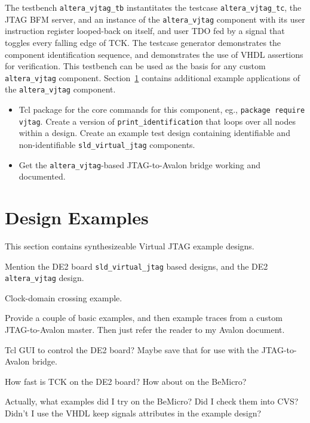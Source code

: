 \documentclass[10pt,twoside]{article}
\begin{document}
The testbench \verb+altera_vjtag_tb+ instantitates the testcase
\verb+altera_vjtag_tc+, the JTAG BFM server, and an instance
of the \verb+altera_vjtag+ component with its user instruction
register looped-back on itself, and user TDO fed by a signal
that toggles every falling edge of TCK.
The testcase generator demonstrates the component identification
sequence, and demonstrates the use of VHDL assertions for
verification. This testbench can be used
as the basis for any custom \verb+altera_vjtag+ component. 
Section~\ref{sec:examples} contains additional example applications
of the \verb+altera_vjtag+ component.


\vskip10mm
\begin{itemize}
\item Tcl package for the core commands for this component, eg.,
\verb+package require vjtag+. Create a version of \verb+print_identification+
that loops over all nodes within a design. Create an example test
design containing identifiable and non-identifiable \verb+sld_virtual_jtag+ components.
\item Get the \verb+altera_vjtag+-based JTAG-to-Avalon bridge working and documented.
\end{itemize}

\clearpage
\section{Design Examples}
\label{sec:examples}

This section contains synthesizeable Virtual JTAG example
designs.

Mention the DE2 board \verb+sld_virtual_jtag+ based designs,
and the DE2 \verb+altera_vjtag+ design.

Clock-domain crossing example.

Provide a couple of basic examples, and then example traces
from a custom JTAG-to-Avalon master. Then just refer the
reader to my Avalon document.

Tcl GUI to control the DE2 board? Maybe save that for use with
the JTAG-to-Avalon bridge.

How fast is TCK on the DE2 board? How about on the BeMicro?

Actually, what examples did I try on the BeMicro? Did I check
them into CVS? Didn't I use the VHDL keep signals attributes
in the example design?
\end{document}
